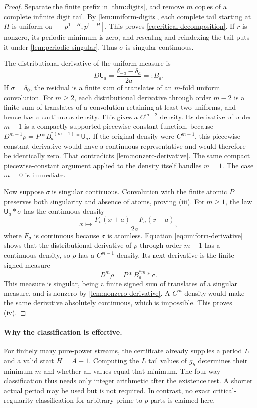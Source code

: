 \documentclass[11pt,a4paper]{article}
\theoremstyle{remark}
\newcommand{\Unif}{\mathsf U}
\begin{document}
\begin{proof}
Separate the finite prefix in \cref{thm:digits}, and remove $m$ copies of a
complete infinite digit tail. By \cref{lem:uniform-digits}, each complete tail
starting at $H$ is uniform on $[-p^{1-H},p^{1-H}]$. This proves
\eqref{eq:critical-decomposition}. If $r$ is nonzero, its periodic minimum is
zero, and rescaling and reindexing the tail puts it under
\cref{lem:periodic-singular}. Thus $\sigma$ is singular continuous.

The distributional derivative of the uniform measure is
\begin{equation}
 D\Unif_a=\frac{\delta_{-a}-\delta_a}{2a}=:B_a.
 \label{eq:uniform-derivative}
\end{equation}
If $\sigma=\delta_0$, the residual is a finite sum of translates of an
$m$-fold uniform convolution. For $m\ge2$, each distributional derivative
through order $m-2$ is a finite sum of translates of a convolution retaining
at least two uniforms, and hence has a continuous density. This gives a
$C^{m-2}$ density. Its derivative of order $m-1$ is a compactly supported
piecewise constant function, because
$D^{m-1}\rho=P*B_a^{*(m-1)}*\Unif_a$.
If the original density were $C^{m-1}$, this piecewise constant derivative
would have a continuous representative and would therefore be identically
zero. That contradicts \cref{lem:nonzero-derivative}. The same compact
piecewise-constant argument applied to the density itself handles $m=1$.
The case $m=0$ is immediate.

Now suppose $\sigma$ is singular continuous. Convolution with the finite
atomic $P$ preserves both singularity and absence of atoms, proving (iii).
For $m\ge1$, the law $\Unif_a*\sigma$ has the continuous density
\[
 x\longmapsto\frac{F_\sigma(x+a)-F_\sigma(x-a)}{2a},
\]
where $F_\sigma$ is continuous because $\sigma$ is atomless. Equation
\eqref{eq:uniform-derivative} shows that the distributional derivative of
$\rho$ through order $m-1$ has a continuous density, so $\rho$ has a
$C^{m-1}$ density. Its next derivative is the finite signed measure
\[
 D^m\rho=P*B_a^{*m}*\sigma.
\]
This measure is singular, being a finite signed sum of translates of a
singular measure, and is nonzero by \cref{lem:nonzero-derivative}. A $C^m$
density would make the same derivative absolutely continuous, which is
impossible. This proves (iv).
\end{proof}

\paragraph{Why the classification is effective.}
For finitely many pure-power streams, the certificate already supplies a
period $L$ and a valid start $H=A+1$. Computing the $L$ tail values of $g_h$
determines their minimum $m$ and whether all values equal that minimum.
The four-way classification thus needs only integer arithmetic after the
existence test. A shorter actual period may be used but is not required.
In contrast, no exact critical-regularity classification for arbitrary
prime-to-$p$ parts is claimed here.
\end{document}
